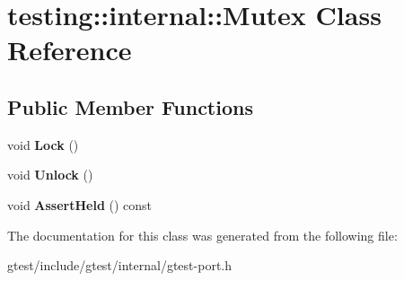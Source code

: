 \hypertarget{classtesting_1_1internal_1_1Mutex}{}\section{testing\+:\+:internal\+:\+:Mutex Class Reference}
\label{classtesting_1_1internal_1_1Mutex}
\subsection*{Public Member Functions}
\begin{DoxyCompactItemize}
\item 
\mbox{\label{classtesting_1_1internal_1_1Mutex_ae7e2191886c00182176b23c4f4d049f8}} 
void {\bfseries Lock} ()
\item 
\mbox{\label{classtesting_1_1internal_1_1Mutex_a315188055de1be98884519ad84eff2e6}} 
void {\bfseries Unlock} ()
\item 
\mbox{\label{classtesting_1_1internal_1_1Mutex_af45bf1660ac4110338a02a8680b2f486}} 
void {\bfseries Assert\+Held} () const
\end{DoxyCompactItemize}


The documentation for this class was generated from the following file\+:\begin{DoxyCompactItemize}
\item 
gtest/include/gtest/internal/gtest-\/port.\+h\end{DoxyCompactItemize}
